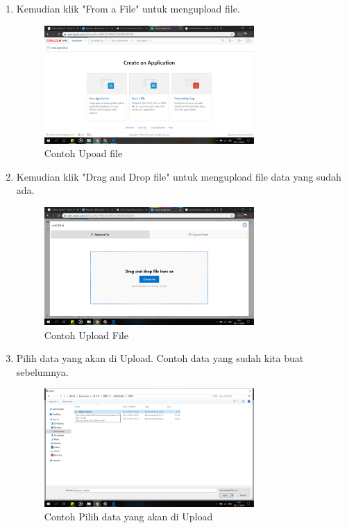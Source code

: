 \begin{enumerate}
\item Kemudian klik "From a File" untuk mengupload file.
    \begin{figure}[!htbp]
    \centering
    \includegraphics[width=8cm]{picture/19.png}
    \caption{Contoh Upoad file}
    \end{figure}
    
\item Kemudian klik "Drag and Drop file" untuk mengupload file data yang sudah ada.
    \begin{figure}[!htbp]
    \centering
    \includegraphics[width=8cm]{picture/20.png}
    \caption{Contoh Upload File}
    \end{figure}
    
\newpage
\item Pilih data yang akan di Upload. Contoh data yang sudah kita buat sebelumnya.
    \begin{figure}[!htbp]
    \centering
    \includegraphics[width=8cm]{picture/21.png}
    \caption{Contoh Pilih data yang akan di Upload}
    \end{figure}
    

\end{enumerate}
